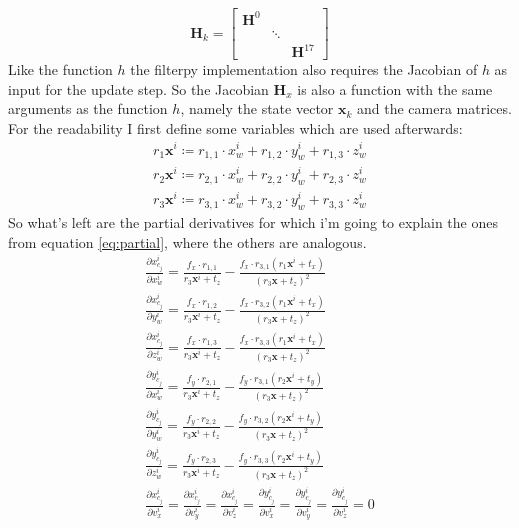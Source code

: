 \begin{equation}
\mathbf{H}_k =
\begin{bmatrix}
\mathbf{H}^0 &  & \\
& \ddots & \\
& & \mathbf{H}^{17}
\end{bmatrix}
\end{equation}
Like the function $h$ the filterpy \cite{filterpydoc} implementation also requires the Jacobian of $h$ as input for the update step. So the Jacobian $\mathbf{H}_x$ is also a function with the same arguments as the function $h$, namely the state vector $\mathbf{x}_k$ and the camera matrices. For the readability I first define some variables which are used afterwards:
\begin{align}
r_{1}\mathbf{x}^i \coloneqq r_{1,1} \cdot x_w^i + r_{1,2} \cdot y_w^i + r_{1,3} \cdot z_w^i \\
r_{2}\mathbf{x}^i \coloneqq r_{2,1} \cdot x_w^i + r_{2,2} \cdot y_w^i + r_{2,3} \cdot z_w^i \\
r_{3}\mathbf{x}^i \coloneqq r_{3,1} \cdot x_w^i + r_{3,2} \cdot y_w^i + r_{3,3} \cdot z_w^i
\end{align}
So what's left are the partial derivatives for which i'm going to explain the ones from equation \ref{eq:partial}, where the others are analogous.
\begin{align}
\frac{\partial x^i_{c_j}}{\partial x^i_w} = \frac{f_x \cdot r_{1,1}}{r_{3}\mathbf{x}^i + t_z} - \frac{f_x \cdot r_{3,1}(r_{1}\mathbf{x}^i + t_x)}{(r_{3}\mathbf{x} + t_z)^2}\\
\frac{\partial x^i_{c_j}}{\partial y^i_w} = \frac{f_x \cdot r_{1,2}}{r_{3}\mathbf{x}^i + t_z} - \frac{f_x \cdot r_{3,2}(r_{1}\mathbf{x}^i + t_x)}{(r_{3}\mathbf{x} + t_z)^2}\\
\frac{\partial x^i_{c_j}}{\partial z^i_w} = \frac{f_x \cdot r_{1,3}}{r_{3}\mathbf{x}^i + t_z} - \frac{f_x \cdot r_{3,3}(r_{1}\mathbf{x}^i + t_x)}{(r_{3}\mathbf{x} + t_z)^2}\\
\frac{\partial y^i_{c_j}}{\partial x^i_w} = \frac{f_y \cdot r_{2,1}}{r_{3}\mathbf{x}^i + t_z} - \frac{f_y \cdot r_{3,1}(r_{2}\mathbf{x}^i + t_y)}{(r_{3}\mathbf{x} + t_z)^2}\\
\frac{\partial y^i_{c_j}}{\partial y^i_w} = \frac{f_y \cdot r_{2,2}}{r_{3}\mathbf{x}^i + t_z} - \frac{f_y \cdot r_{3,2}(r_{2}\mathbf{x}^i + t_y)}{(r_{3}\mathbf{x} + t_z)^2}\\
\frac{\partial y^i_{c_j}}{\partial z^i_w} = \frac{f_y \cdot r_{2,3}}{r_{3}\mathbf{x}^i + t_z} - \frac{f_y \cdot r_{3,3}(r_{2}\mathbf{x}^i + t_y)}{(r_{3}\mathbf{x} + t_z)^2}\\ \frac{\partial x^i_{c_j}}{\partial v^i_x} = \frac{\partial x^i_{c_j}}{\partial v^i_y} = \frac{\partial x^i_{c_j}}{\partial v^i_z} = \frac{\partial y^i_{c_j}}{\partial v^i_x} = \frac{\partial y^i_{c_j}}{\partial v^i_y} = \frac{\partial y^i_{c_j}}{\partial v^i_z} = 0
\end{align}

